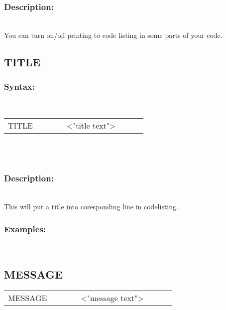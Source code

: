         \subsubsection{Description:}\\
        You can turn on/off printing to code listing in some parts of your code.\\

        \subsection{TITLE}
        \subsubsection{Syntax:}\\
            {
            \texttt{}
            \begin{tabular}[h!]{llll}
                { \color{highlight_directive} TITLE }\verb`       `{ \color{highlight_string} <"title text"> }
            \end{tabular}
            }\\
            \\
        \subsubsection{Description:}\\
        This will put a title into coresponding line in codelisting.  \\
        \subsubsection{Examples:}\\
                \begin{code}[h!]
                    directive}\verb'TITLE'}\verb'    '
                    constant}\verb'"Text, that will show up in the codelisting"'}
                \end{code}

        \subsection{MESSAGE}
            {
            \texttt{}
            \begin{tabular}[h!]{llll}
                { \color{highlight_directive} MESSAGE }\verb`       `{ \color{highlight_string} <"message text"> }
            \end{tabular}
            }\\
            \\
